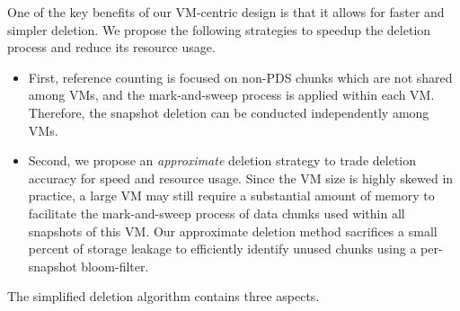 One of the key benefits of our VM-centric design is that it allows for faster and simpler deletion. 
We propose the following strategies to speedup the deletion process and reduce its resource usage.
\begin{itemize}
\item First, reference counting is focused on non-PDS chunks which are not shared among VMs,
and the mark-and-sweep process is applied within each VM. 
Therefore,  the snapshot deletion can be conducted independently among VMs.

\item Second,  we propose an {\em approximate} deletion strategy to trade deletion accuracy for speed and
resource usage. Since the VM size is highly skewed in practice,  a large VM may still require
a substantial amount of memory  to facilitate the mark-and-sweep process of data chunks used within all snapshots
of this VM. 
Our approximate deletion method sacrifices a small percent of storage leakage
to efficiently identify unused chunks using a per-snapshot bloom-filter.
\end{itemize}
The simplified deletion algorithm contains three aspects.
